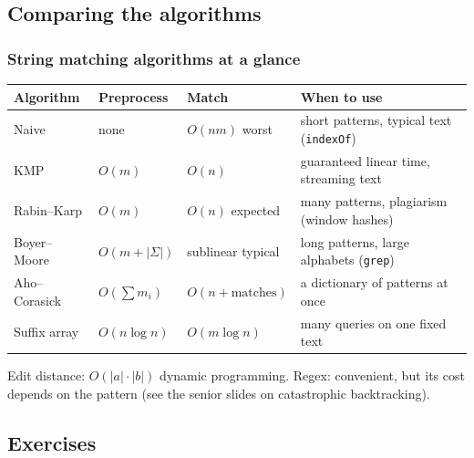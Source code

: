 \documentclass[aspectratio=169,10pt,compress]{beamer}
\begin{document}
\subsection[Compare]{Comparing the algorithms}




\begin{frame}[t,fragile] \frametitle{String matching algorithms at a glance}
  \small
  \begin{tabular}{@{}L{0.2\textwidth}L{0.14\textwidth}L{0.17\textwidth}L{0.4\textwidth}@{}}
    \toprule
    \textbf{Algorithm} & \textbf{Preprocess} & \textbf{Match} & \textbf{When to use} \\
    \midrule
    Naive            & none     & $O(nm)$ worst      & short patterns, typical text (\texttt{indexOf}) \\
    KMP              & $O(m)$   & $O(n)$             & guaranteed linear time, streaming text \\
    Rabin--Karp      & $O(m)$   & $O(n)$ expected    & many patterns, plagiarism (window hashes) \\
    Boyer--Moore     & $O(m + |\Sigma|)$ & sublinear typical & long patterns, large alphabets (\texttt{grep}) \\
    Aho--Corasick    & $O(\sum m_{i})$ & $O(n + \text{matches})$ & a dictionary of patterns at once \\
    Suffix array     & $O(n \log n)$ & $O(m \log n)$ & many queries on one fixed text \\
    \bottomrule
  \end{tabular}

  \vspace{0.5em}
  Edit distance: $O(|a| \cdot |b|)$ dynamic programming. Regex: convenient, but its cost depends on the pattern
  (see the senior slides on catastrophic backtracking).
\end{frame}

\subsection[Exercises]{Exercises}
\end{document}
